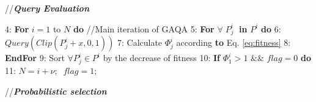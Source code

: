 \documentclass[lettersize,journal]{IEEEtran}
\begin{document}
\begin{algorithm}[t]
\begin{small}
			//\textbf{{\emph{\textcolor[rgb]{0,0,0}{Query Evaluation}}}}
			\begin{algorithmic}[0]
				\STATE \hspace{-0.3cm} {\small 4:} \hspace{-0.00cm}  \textbf{For} $i=1$ to $N$ \textbf{do} //Main iteration of GAQA
				\STATE \hspace{-0.3cm} {\small 5:} \hspace{-0.00cm} \hspace{0.32cm} \textbf{For} $\forall\;P^i_j\;$  \textbf{in}  $P^i$ \textbf{do}
				\STATE \hspace{-0.3cm} {\small 6:} \hspace{-0.00cm} \hspace{0.25cm} \hspace{0.25cm} $Query(Clip(P^i_j+x,0,1))$
				\STATE \hspace{-0.3cm} {\small 7:} \hspace{-0.00cm} \hspace{0.25cm} \hspace{0.25cm} Calculate $\Phi^i_j$ according \textbf{to} Eq. \ref{eq:fitness} 
				\STATE \hspace{-0.3cm} {\small 8:} \hspace{-0.00cm} \hspace{0.48cm}\textbf{EndFor}
				\STATE \hspace{-0.3cm} {\small 9:} \hspace{-0.00cm} \hspace{0.36cm} Sort $\forall P^i_j \in P^i$ by the decrease of fitness
				\STATE \hspace{-0.3cm} {\small 10:} \hspace{-0.40cm} \hspace{0.25cm}  \hspace{0.23cm} \textbf{If} $\Phi^i_1>1$ $\&\&$ $flag=0$ \textbf{do}
				\STATE \hspace{-0.3cm} {\small 11:} \hspace{-0.05cm}  \hspace{0.5cm} $N=i+\nu;\;\;flag=1;$
			\end{algorithmic} 
			
			
			//\textbf{{\emph{\textcolor[rgb]{0,0,0}{Probabilistic selection}}}}
			\begin{algorithmic}[0]
				

\end{algorithmic}
\end{small}
\end{algorithm}
\end{document}
